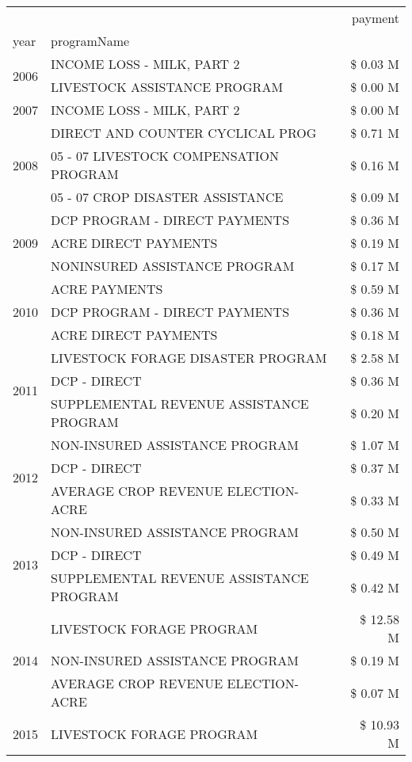 \begin{tabular}{llr}
\toprule
 &  & payment \\
year & programName &  \\
\midrule
\multirow[t]{2}{*}{2006} & INCOME LOSS - MILK, PART 2 & \$ 0.03 M \\
 & LIVESTOCK ASSISTANCE PROGRAM & \$ 0.00 M \\
\cline{1-3}
2007 & INCOME LOSS - MILK, PART 2 & \$ 0.00 M \\
\cline{1-3}
\multirow[t]{3}{*}{2008} & DIRECT AND COUNTER CYCLICAL PROG & \$ 0.71 M \\
 & 05 - 07 LIVESTOCK COMPENSATION PROGRAM & \$ 0.16 M \\
 & 05 - 07 CROP DISASTER ASSISTANCE & \$ 0.09 M \\
\cline{1-3}
\multirow[t]{3}{*}{2009} & DCP PROGRAM - DIRECT PAYMENTS & \$ 0.36 M \\
 & ACRE DIRECT PAYMENTS & \$ 0.19 M \\
 & NONINSURED ASSISTANCE PROGRAM & \$ 0.17 M \\
\cline{1-3}
\multirow[t]{3}{*}{2010} & ACRE PAYMENTS & \$ 0.59 M \\
 & DCP PROGRAM - DIRECT PAYMENTS & \$ 0.36 M \\
 & ACRE DIRECT PAYMENTS & \$ 0.18 M \\
\cline{1-3}
\multirow[t]{3}{*}{2011} & LIVESTOCK FORAGE DISASTER PROGRAM & \$ 2.58 M \\
 & DCP - DIRECT & \$ 0.36 M \\
 & SUPPLEMENTAL REVENUE ASSISTANCE PROGRAM & \$ 0.20 M \\
\cline{1-3}
\multirow[t]{3}{*}{2012} & NON-INSURED ASSISTANCE PROGRAM & \$ 1.07 M \\
 & DCP - DIRECT & \$ 0.37 M \\
 & AVERAGE CROP REVENUE ELECTION-ACRE & \$ 0.33 M \\
\cline{1-3}
\multirow[t]{3}{*}{2013} & NON-INSURED ASSISTANCE PROGRAM & \$ 0.50 M \\
 & DCP - DIRECT & \$ 0.49 M \\
 & SUPPLEMENTAL REVENUE ASSISTANCE PROGRAM & \$ 0.42 M \\
\cline{1-3}
\multirow[t]{3}{*}{2014} & LIVESTOCK FORAGE PROGRAM & \$ 12.58 M \\
 & NON-INSURED ASSISTANCE PROGRAM & \$ 0.19 M \\
 & AVERAGE CROP REVENUE ELECTION-ACRE & \$ 0.07 M \\
\cline{1-3}
\multirow[t]{3}{*}{2015} & LIVESTOCK FORAGE PROGRAM & \$ 10.93 M \\

\end{tabular}

